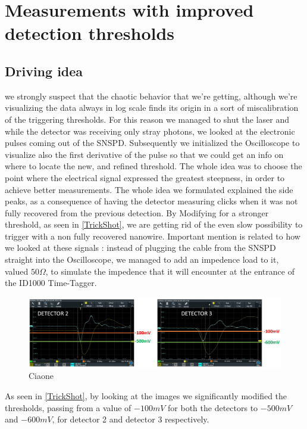 \section{Measurements with improved detection thresholds}
\label{cpp:Improvements&discussion}

\subsection{Driving idea}
we strongly suspect that the chaotic behavior that we're getting, although we're visualizing the data always in log scale finds its origin in a sort of miscalibration of the triggering thresholds.
For this reason we managed to shut the laser and while the detector was receiving only stray photons, we looked at the electronic pulses coming out of the SNSPD.
Subsequently we initialized the Oscilloscope to visualize also the first derivative of the pulse so that we could get an info on where to locate the new, and refined threshold. The whole idea was to choose the point where the electrical signal expressed the greatest steepness, in order to achieve better measurements.
The whole idea we formulated explained the side peaks, as a consequence of having the detector measuring clicks when it was not fully recovered from the previous detection. By Modifying for a stronger threshold, as seen in \autoref{TrickShot}, we are getting rid of the even slow possibility to trigger with a non fully recovered nanowire.
Important mention is related to how we looked at these signals : instead of plugging the cable from the SNSPD straight into the Oscilloscope, we managed to add an impedence load to it, valued $50 \Omega$, to simulate the impedence that it will encounter at the entrance of the ID1000 Time-Tagger.

\begin{figure}[hbtp]
\centering
\includegraphics[width=1\textwidth]{ScopeShots.jpg}
\caption{Ciaone}
\label{TrickShot}
\end{figure}

As seen in \autoref{TrickShot}, by looking at the images we significantly modified the thresholds, passing from a value of $-100mV$ for both the detectors to $-500mV$ and $-600mV$, for detector 2 and detector 3 respectively.

